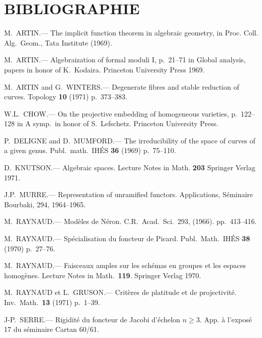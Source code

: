 \documentclass[12pt,a4paper]{article}
\theoremstyle{plain}
\theoremstyle{definition}
\theoremstyle{remark}
\begin{document}
\section*{BIBLIOGRAPHIE}

\begin{enumerate}[label={[\arabic*]},leftmargin=2em]
\item M.~ARTIN.--- The implicit function theorem in algebraic geometry, in Proc. Coll. Alg.~Geom., Tata Institute (1969).

\item M.~ARTIN.--- Algebraization of formal moduli I, p.~21--71 in Global analysis, papers in honor of K.~Kodaira. Princeton University Press 1969.

\item M.~ARTIN and G.~WINTERS.--- Degenerate fibres and stable reduction of curves. Topology \textbf{10} (1971) p.~373--383.

\item W.L.~CHOW.--- On the projective embedding of homogeneous varieties, p.~122--128 in A symp.~in honor of S.~Lefschetz. Princeton University Press.

\item P.~DELIGNE and D.~MUMFORD.--- The irreducibility of the space of curves of a given genus. Publ.~math.~IHÉS \textbf{36} (1969) p.~75--110.

\item D.~KNUTSON.--- Algebraic spaces. Lecture Notes in Math. \textbf{203} Springer Verlag 1971.

\item J.P.~MURRE.--- Representation of unramified functors. Applications, Séminaire Bourbaki, 294, 1964--1965.

\item M.~RAYNAUD.--- Modèles de Néron. C.R.~Acad.~Sci.~293, (1966). pp.~413--416.

\item M.~RAYNAUD.--- Spécialisation du foncteur de Picard. Publ.~Math.~IHÉS \textbf{38} (1970) p.~27--76.

\item M.~RAYNAUD.--- Faisceaux amples sur les schémas en groupes et les espaces homogènes. Lecture Notes in Math.~\textbf{119}. Springer Verlag 1970.

\item M.~RAYNAUD et L.~GRUSON.--- Critères de platitude et de projectivité. Inv.~Math.~\textbf{13} (1971) p.~1--39.

\item J-P.~SERRE.--- Rigidité du foncteur de Jacobi d'échelon $n \geq 3$. App. à l'exposé 17 du séminaire Cartan 60/61.
\end{enumerate}
\end{document}
